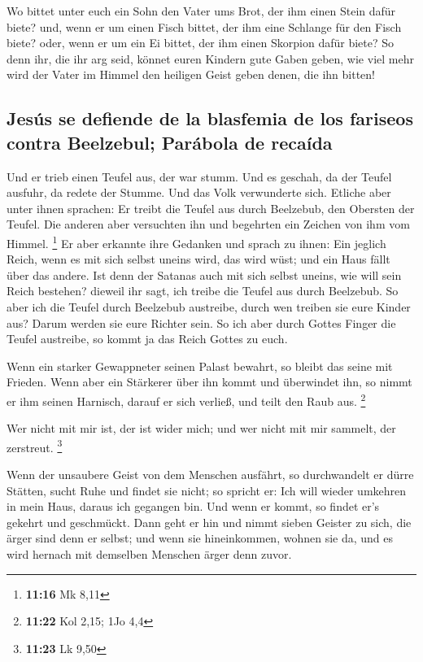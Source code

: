  Wo bittet unter euch ein Sohn den Vater ums Brot, der
ihm einen Stein dafür biete? und, wenn er um einen Fisch bittet, der ihm
eine Schlange für den Fisch biete?  oder, wenn er um ein
Ei bittet, der ihm einen Skorpion dafür biete?  So denn
ihr, die ihr arg seid, könnet euren Kindern gute Gaben geben, wie viel
mehr wird der Vater im Himmel den heiligen Geist geben denen, die ihn
bitten!

\hypertarget{jesuxfas-se-defiende-de-la-blasfemia-de-los-fariseos-contra-beelzebul-paruxe1bola-de-recauxedda}{%
\subsection{Jesús se defiende de la blasfemia de los fariseos contra
Beelzebul; Parábola de
recaída}\label{jesuxfas-se-defiende-de-la-blasfemia-de-los-fariseos-contra-beelzebul-paruxe1bola-de-recauxedda}}

 Und er trieb einen Teufel aus, der war stumm. Und es
geschah, da der Teufel ausfuhr, da redete der Stumme. Und das Volk
verwunderte sich.  Etliche aber unter ihnen sprachen: Er
treibt die Teufel aus durch Beelzebub, den Obersten der Teufel.
 Die anderen aber versuchten ihn und begehrten ein
Zeichen von ihm vom Himmel. \footnote{\textbf{11:16} Mk 8,11}
 Er aber erkannte ihre Gedanken und sprach zu ihnen: Ein
jeglich Reich, wenn es mit sich selbst uneins wird, das wird wüst; und
ein Haus fällt über das andere.  Ist denn der Satanas
auch mit sich selbst uneins, wie will sein Reich bestehen? dieweil ihr
sagt, ich treibe die Teufel aus durch Beelzebub.  So aber
ich die Teufel durch Beelzebub austreibe, durch wen treiben sie eure
Kinder aus? Darum werden sie eure Richter sein.  So ich
aber durch Gottes Finger die Teufel austreibe, so kommt ja das Reich
Gottes zu euch.

 Wenn ein starker Gewappneter seinen Palast bewahrt, so
bleibt das seine mit Frieden.  Wenn aber ein Stärkerer
über ihn kommt und überwindet ihn, so nimmt er ihm seinen Harnisch,
darauf er sich verließ, und teilt den Raub aus. \footnote{\textbf{11:22}
  Kol 2,15; 1Jo 4,4}

 Wer nicht mit mir ist, der ist wider mich; und wer nicht
mit mir sammelt, der zerstreut. \footnote{\textbf{11:23} Lk 9,50}

 Wenn der unsaubere Geist von dem Menschen ausfährt, so
durchwandelt er dürre Stätten, sucht Ruhe und findet sie nicht; so
spricht er: Ich will wieder umkehren in mein Haus, daraus ich gegangen
bin.  Und wenn er kommt, so findet er's gekehrt und
geschmückt.  Dann geht er hin und nimmt sieben Geister zu
sich, die ärger sind denn er selbst; und wenn sie hineinkommen, wohnen
sie da, und es wird hernach mit demselben Menschen ärger denn zuvor.


